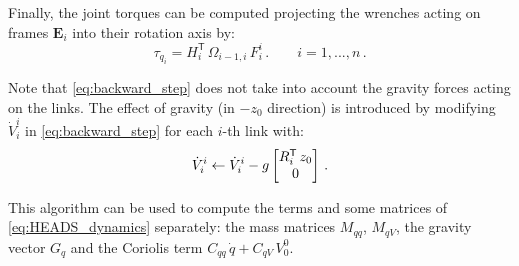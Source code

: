 Finally, the joint torques can be computed projecting the wrenches acting on frames $\mathbf{E}_i$ into their rotation axis by:
%
\begin{equation}
\tau_{q_i} = H^\mathsf{T}_{i} \, \Omega_{i-1,i} \, F^{i}_{i} \,. \qquad i = 1,...,n \,.
\label{eq:joint_force_projection}
\end{equation}

Note that \eqref{eq:backward_step} does not take into account the gravity forces acting on the links. 
%
The effect of gravity (in $-z_0$ direction) is introduced by modifying $\dot{V}^i_{i}$ in \eqref{eq:backward_step} for each $i$-th link with:
%
\begin{equation}
\dot{V}^i_{i} \leftarrow \dot{V}^i_{i} - g \begin{bmatrix}R^\mathsf{T}_{i} \, z_0 \\ 0\end{bmatrix} \,.
\label{eq:gravity_effect}
\end{equation}

This algorithm can be used to compute the terms and some matrices of \eqref{eq:HEADS_dynamics} separately: the mass matrices $M_{qq}$, $M_{qV}$, the gravity vector $G_q$ and the Coriolis term $C_{qq} \, \dot{q} + C_{qV} \, V^0_{0}$.

%
